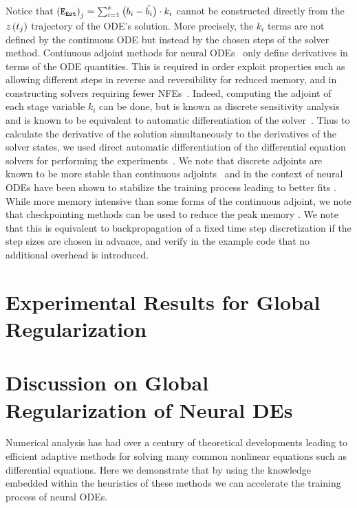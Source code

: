 Notice that $\left(\texttt{E}_{\texttt{Est}}\right)_j = \sum_{i = 1}^s \left(b_i - \tilde{b_i}\right) \cdot k_i$ cannot be constructed directly from the $z\left(t_j\right)$ trajectory of the ODE's solution. More precisely, the $k_i$ terms are not defined by the continuous ODE but instead by the chosen steps of the solver method. Continuous adjoint methods for neural ODEs~\citep{chen2018neural, zhuang2021mali} only define derivatives in terms of the ODE quantities. This is required in order exploit properties such as allowing different steps in reverse and reversibility for reduced memory, and in constructing solvers requiring fewer NFEs~\citep{kidger2020hey}. Indeed, computing the adjoint of each stage variable $k_i$ can be done, but is known as discrete sensitivity analysis and is known to be equivalent to automatic differentiation of the solver~\citep{zhang2014fatode}. Thus to calculate the derivative of the solution simultaneously to the derivatives of the solver states, we used direct automatic differentiation of the differential equation solvers for performing the experiments~\citep{innes2018don}. We note that discrete adjoints are known to be more stable than continuous adjoints~\citep{zhang2014fatode} and in the context of neural ODEs have been shown to stabilize the training process leading to better fits \citep{gholami2019anode,onken2020discretize}. While more memory intensive than some forms of the continuous adjoint, we note that checkpointing methods can be used to reduce the peak memory \citep{dauvergne2006data}. We note that this is equivalent to backpropagation of a fixed time step discretization if the step sizes are chosen in advance, and verify in the example code that no additional overhead is introduced.


\section{Experimental Results for Global Regularization}
\label{sec:experimental_results_global_regularized_neural_des}


\section{Discussion on Global Regularization of Neural DEs}
\label{sec:discussion_on_global_regularization_of_neural_des}

Numerical analysis has had over a century of theoretical developments leading to efficient adaptive methods for solving many common nonlinear equations such as differential equations. Here we demonstrate that by using the knowledge embedded within the heuristics of these methods we can accelerate the training process of neural ODEs.

